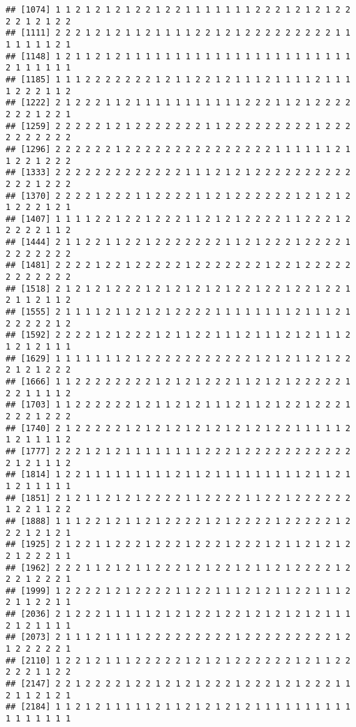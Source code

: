 \documentclass[
]{article}
\begin{document}
\begin{verbatim}
## [1074] 1 1 2 1 2 1 2 1 2 2 1 2 2 1 1 1 1 1 1 1 2 2 2 1 2 1 2 1 2 2 2 2 1 2 1 2 2
## [1111] 2 2 2 1 2 1 2 1 1 2 1 1 1 1 2 2 1 2 1 2 2 2 2 2 2 2 2 2 1 1 1 1 1 1 1 2 1
## [1148] 1 2 1 1 2 1 2 1 1 1 1 1 1 1 1 1 1 1 1 1 1 1 1 1 1 1 1 1 1 1 2 1 1 1 1 1 1
## [1185] 1 1 1 2 2 2 2 2 2 2 1 2 1 1 2 2 1 2 1 1 1 2 1 1 1 1 2 1 1 1 1 2 2 2 1 1 2
## [1222] 2 1 2 2 2 1 1 2 1 1 1 1 1 1 1 1 1 1 1 2 2 2 1 1 2 1 2 2 2 2 2 2 2 1 2 2 1
## [1259] 2 2 2 2 2 1 2 1 2 2 2 2 2 2 2 1 1 2 2 2 2 2 2 2 2 2 1 2 2 2 2 2 2 2 2 2 2
## [1296] 2 2 2 2 2 2 1 2 2 2 2 2 2 2 2 2 2 2 2 2 2 2 1 1 1 1 1 1 2 1 1 2 2 1 2 2 2
## [1333] 2 2 2 2 2 2 2 2 2 2 2 2 2 1 1 1 2 1 2 1 2 2 2 2 2 2 2 2 2 2 2 2 2 1 2 2 2
## [1370] 2 2 2 2 1 2 2 2 1 1 2 2 2 2 1 1 2 1 2 2 2 2 2 2 1 2 1 2 1 2 1 2 2 2 1 2 1
## [1407] 1 1 1 1 2 2 1 2 2 1 2 2 2 1 1 2 1 2 1 2 2 2 2 1 1 2 2 2 1 2 2 2 2 2 1 1 2
## [1444] 2 1 1 2 2 1 1 2 2 1 2 2 2 2 2 2 2 1 1 2 1 2 2 2 1 2 2 2 2 1 2 2 2 2 2 2 2
## [1481] 2 2 2 2 1 2 2 1 2 2 2 2 2 1 2 2 2 2 2 2 2 1 2 2 1 2 2 2 2 2 2 2 2 2 2 2 2
## [1518] 2 1 2 1 2 1 2 2 2 1 2 1 2 1 2 1 2 1 2 2 1 2 2 1 2 2 1 2 2 1 2 1 1 2 1 1 2
## [1555] 2 1 1 1 1 2 1 1 2 1 2 1 2 2 2 2 1 1 1 1 1 1 1 1 2 1 1 1 2 1 2 2 2 2 2 1 2
## [1592] 2 2 2 2 1 2 1 2 2 2 1 2 1 1 2 2 1 1 1 2 1 1 1 2 1 2 1 1 1 2 1 2 1 2 1 1 1
## [1629] 1 1 1 1 1 1 1 2 1 2 2 2 2 2 2 2 2 2 2 2 1 2 1 2 1 1 2 1 2 2 2 1 2 1 2 2 2
## [1666] 1 1 2 2 2 2 2 2 2 2 1 2 1 2 1 2 2 2 1 1 2 1 2 1 2 2 2 2 2 1 2 2 1 1 1 1 2
## [1703] 1 1 2 2 2 2 2 2 1 2 1 1 2 1 2 1 1 1 2 1 1 2 1 2 2 1 2 2 2 1 2 2 2 1 2 2 2
## [1740] 2 1 2 2 2 2 2 1 2 1 2 1 2 1 2 1 2 1 2 1 2 1 2 2 1 1 1 1 1 2 1 2 1 1 1 1 2
## [1777] 2 2 2 1 2 1 2 1 1 1 1 1 1 1 1 2 2 2 1 2 2 2 2 2 2 2 2 2 2 2 2 1 2 1 1 1 2
## [1814] 1 2 2 1 1 1 1 1 1 1 1 1 2 1 1 2 1 1 1 1 1 1 1 1 1 2 1 1 2 1 1 2 1 1 1 1 1
## [1851] 2 1 2 1 1 2 1 2 1 2 2 2 2 1 1 2 2 2 2 1 1 2 2 1 2 2 2 2 2 2 1 2 2 1 1 2 2
## [1888] 1 1 1 2 2 1 2 1 1 2 1 2 2 2 2 1 2 1 2 2 2 2 1 2 2 2 2 2 1 2 2 2 1 2 1 2 1
## [1925] 2 1 2 2 1 1 2 2 2 1 2 2 2 1 2 2 2 1 2 2 2 1 2 1 1 2 1 2 1 2 2 1 2 2 2 1 1
## [1962] 2 2 2 1 1 2 1 2 1 1 2 2 2 1 2 1 2 2 1 2 1 1 2 1 2 2 2 2 1 2 2 2 1 2 2 2 1
## [1999] 1 2 2 2 2 1 2 1 2 2 2 2 1 1 2 2 1 1 1 2 1 2 1 1 2 2 1 1 1 2 2 1 1 2 2 1 1
## [2036] 2 1 2 2 2 1 1 1 1 1 2 1 2 1 2 2 1 2 2 1 2 1 2 1 2 1 2 1 1 1 2 1 2 1 1 1 1
## [2073] 2 1 1 1 2 1 1 1 1 2 2 2 2 2 2 2 2 2 1 2 2 2 2 2 2 2 2 2 1 2 1 2 2 2 2 2 1
## [2110] 1 2 2 1 2 1 1 1 2 2 2 2 2 1 2 1 2 1 2 2 2 2 2 2 1 2 1 1 2 2 2 2 2 1 1 2 2
## [2147] 2 2 1 2 2 2 2 1 2 2 1 2 1 2 1 2 2 2 1 2 2 2 1 2 1 2 2 2 1 1 2 1 1 2 1 2 1
## [2184] 1 1 2 1 2 1 1 1 1 1 2 1 1 2 1 2 1 2 1 2 1 1 1 1 1 1 1 1 1 1 1 1 1 1 1 1 1

\end{verbatim}
\end{document}
